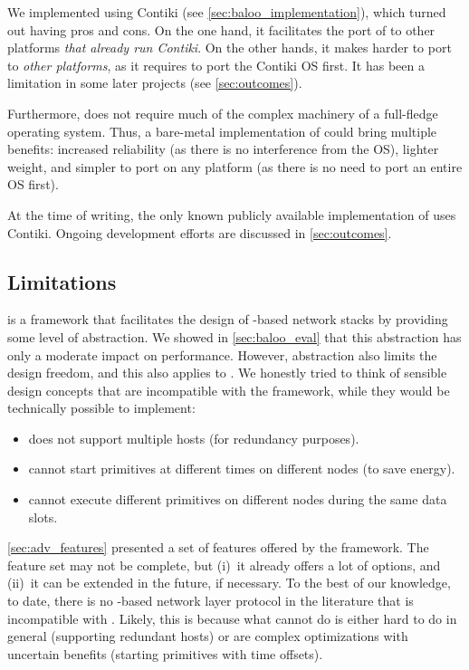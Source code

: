 We implemented \baloo using Contiki (see \cref{sec:baloo_implementation}), which turned out having pros and cons. On the one hand, it facilitates the port of \baloo to other platforms \emph{that already run Contiki}.
On the other hands, it makes \baloo harder to port to \emph{other platforms}, as it requires to port the Contiki OS first. It has been a limitation in some later projects (see \cref{sec:outcomes}).

Furthermore, \baloo does not require much of the complex machinery of a full-fledge operating system. Thus, a bare-metal implementation of \baloo could bring multiple benefits: increased reliability (as there is no interference from the OS), lighter weight, and simpler to port on any platform (as there is no need to port an entire OS first).

At the time of writing, the only known publicly available implementation of \baloo uses Contiki. Ongoing development efforts are discussed in \cref{sec:outcomes}.

\subsection{Limitations}

\baloo is a framework that facilitates the design of \ST-based network stacks by providing some level of abstraction.
We showed in \cref{sec:baloo_eval} that this abstraction has only a moderate impact on performance.
However, abstraction also limits the design freedom, and this also applies to \baloo. We honestly tried to think of sensible design concepts that are incompatible with the framework, while they would be technically possible to implement:
\begin{itemize}
	\item \baloo does not support multiple hosts (\eg for redundancy purposes).
	\item \baloo cannot start primitives at different times on different nodes (\eg to save energy).
	\item \baloo cannot execute different \ST primitives on different nodes during the same data slots.
\end{itemize}

\cref{sec:adv_features} presented a set of features offered by the \baloo framework. The feature set may not be complete, but (i)~it already offers a lot of options, and (ii)~it can be extended in the future, if necessary.
To the best of our knowledge, to date,
there is no \ST-based network layer protocol in the literature that is incompatible with \baloo. Likely, this is because what \baloo cannot do is either hard to do in general (\eg supporting redundant hosts) or are complex optimizations with uncertain benefits (\eg starting primitives with time offsets).


